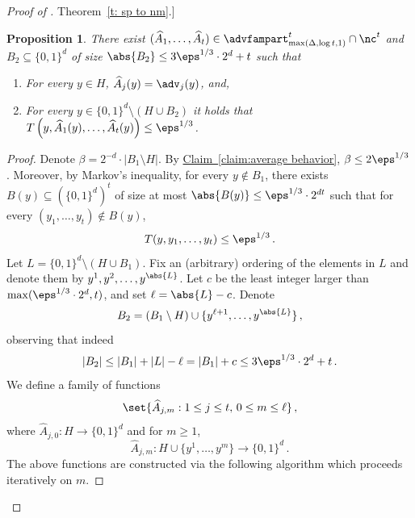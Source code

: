 \documentclass[11pt]{article}
\numberwithin{equation}{section}
\newtheorem{proposition}[theorem]{Proposition}
\theoremstyle{definition}
\theoremstyle{plain}
\newcommand{\expref}[2]{\hyperref[#2]{#1~\ref{#2}}}
\begin{document}
\begin{proof}[Proof of \expref{Theorem}{t: sp to nm}.]
\begin{proposition}\label{c: pi construction}
There exist $(\widehat{A}_1,\ldots,\widehat{A}_t) \in  \advfampart^t_{\max(\Delta, \log t,1)} \cap \nc^t$ and $B_2 \subseteq \{0,1\}^d$ of size $\abs{B_2} \le 3\eps^{1/3}\cdot 2^d + t$ such that
\begin{enumerate}
  \item\label{it:c1} For every $y \in H$, $\widehat{A}_j(y) = \adv_j(y)$, and,
  \item\label{it:c2} For every $y \in \{0,1\}^d \setminus (H \cup B_2)$ it holds that $T\left(y,\widehat{A}_1(y), \ldots, \widehat{A}_t(y)\right) \le \eps^{1/3}$.
\end{enumerate}
\end{proposition}

\begin{proof}

Denote $\beta = 2^{-d} \cdot |B_1\setminus H|$. 
By \expref{Claim}{claim:average behavior}, $\beta \leq 2\eps^{1/3}$. Moreover, by Markov's inequality, for every $y \notin B_1$, there exists $B(y) \subseteq (\{0,1\}^d)^t$ of size at most $\abs{B(y)} \leq  \eps^{1/3} \cdot 2^{dt}$ such that for every $(y_1,\ldots,y_t) \notin B(y)$, \[T(y,y_1,\ldots,y_t) \le \eps^{1/3}\,.\]
Let $L = \{0,1\}^d \setminus (H \cup B_1)$. Fix an (arbitrary) ordering of the elements in $L$ and denote them by $y^1,y^2,\ldots,y^{\abs{L}}$. Let $c$ be the least integer larger than $\max(\eps^{1/3} \cdot 2^d, t)$, and set $\ell = \abs{L} - c$. Denote \[B_2 = (B_1\setminus H) \cup \{y^{\ell+1},\ldots, y^{\abs{L}}\}\,,\] observing that indeed
\[
|B_2| \le |B_1| + |L|-\ell = |B_1| +c \le 3\eps^{1/3}\cdot 2^d + t\,.
\]
%
We define a family of functions
\[
\set{\widehat{A}_{j,m} : 1 \le j \le t,\, 0 \le m \le \ell}\,,
\]
where $\widehat{A}_{j,0} \colon H  \rightarrow \{0,1\}^d$ and for $m \ge 1$,
\[\widehat{A}_{j,m} \colon H \cup \{y^1,\ldots, y^{m}\} \rightarrow \{0,1\}^d\,.\]
The above functions are constructed via the following algorithm which proceeds iteratively on $m$.%

%

\end{proof}
\end{proof}
\end{document}
